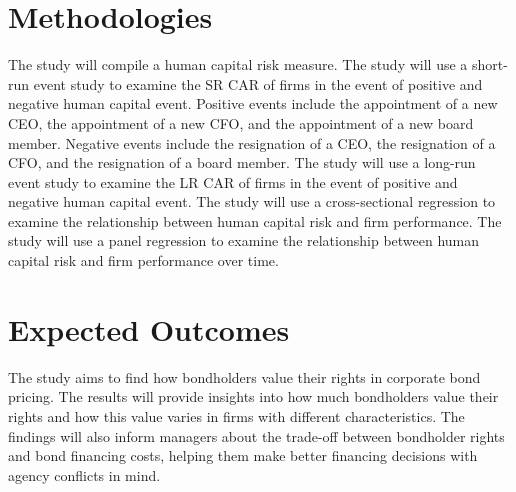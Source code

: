 \documentclass[a4paper, 10pt, authoryear]{elsarticle}
\begin{document}
\section{Methodologies}
The study will compile a human capital risk measure.
The study will use a short-run event study to examine the SR CAR of firms in the event of positive and negative human capital event. Positive events include the appointment of a new CEO, the appointment of a new CFO, and the appointment of a new board member. Negative events include the resignation of a CEO, the resignation of a CFO, and the resignation of a board member. The study will use a long-run event study to examine the LR CAR of firms in the event of positive and negative human capital event. The study will use a cross-sectional regression to examine the relationship between human capital risk and firm performance. The study will use a panel regression to examine the relationship between human capital risk and firm performance over time.

\section{Expected Outcomes}
The study aims to find how bondholders value their rights in corporate bond pricing. The results will provide insights into how much bondholders value their rights and how this value varies in firms with different characteristics. The findings will also inform managers about the trade-off between bondholder rights and bond financing costs, helping them make better financing decisions with agency conflicts in mind.


\end{document}
